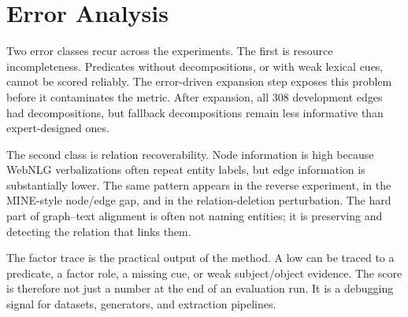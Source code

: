 
\section{Error Analysis}
Two error classes recur across the experiments. The first is resource incompleteness. Predicates without decompositions, or with weak lexical cues, cannot be scored reliably. The error-driven expansion step exposes this problem before it contaminates the metric. After expansion, all 308 development edges had decompositions, but fallback decompositions remain less informative than expert-designed ones.

The second class is relation recoverability. Node information is high because WebNLG verbalizations often repeat entity labels, but edge information is substantially lower. The same pattern appears in the reverse experiment, in the MINE-style node/edge gap, and in the relation-deletion perturbation. The hard part of graph--text alignment is often not naming entities; it is preserving and detecting the relation that links them.

The factor trace is the practical output of the method. A low \lemonscore{} can be traced to a predicate, a factor role, a missing cue, or weak subject/object evidence. The score is therefore not just a number at the end of an evaluation run. It is a debugging signal for datasets, generators, and extraction pipelines.
